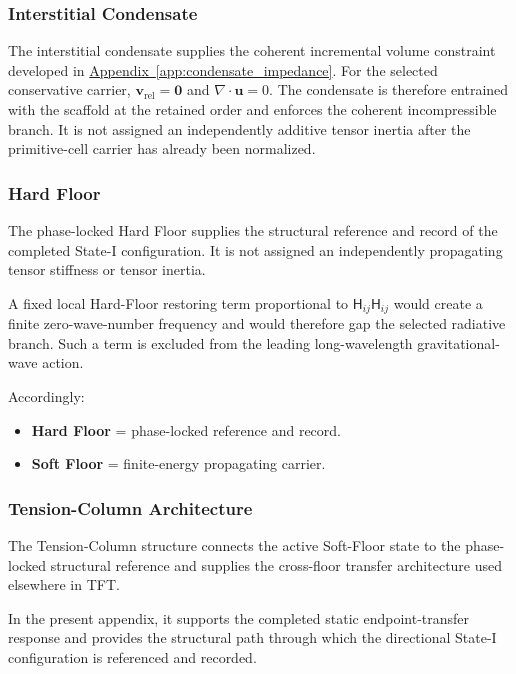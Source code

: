 \subsubsection{Interstitial Condensate}

The interstitial condensate supplies the coherent incremental volume constraint developed in \hyperref[app:condensate_impedance]{Appendix~\ref*{app:condensate_impedance}}. For the selected conservative carrier, $\mathbf{v}_{\mathrm{rel}} = \mathbf{0}$ and $\nabla\cdot\mathbf{u} = 0$. The condensate is therefore entrained with the scaffold at the retained order and enforces the coherent incompressible branch. It is not assigned an independently additive tensor inertia after the primitive-cell carrier has already been normalized.

\subsubsection{Hard Floor}

The phase-locked Hard Floor supplies the structural reference and record of the completed State-I configuration. It is not assigned an independently propagating tensor stiffness or tensor inertia.

A fixed local Hard-Floor restoring term proportional to $\mathsf{H}_{ij} \mathsf{H}_{ij}$ would create a finite zero-wave-number frequency and would therefore gap the selected radiative branch. Such a term is excluded from the leading long-wavelength gravitational-wave action.

Accordingly:
\begin{itemize}
    \item \textbf{Hard Floor} = phase-locked reference and record.
    \item \textbf{Soft Floor} = finite-energy propagating carrier.
\end{itemize}

\subsubsection{Tension-Column Architecture}

The Tension-Column structure connects the active Soft-Floor state to the phase-locked structural reference and supplies the cross-floor transfer architecture used elsewhere in TFT.

In the present appendix, it supports the completed static endpoint-transfer response and provides the structural path through which the directional State-I configuration is referenced and recorded.

